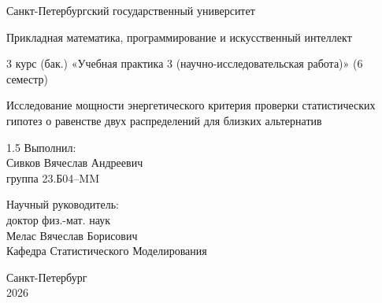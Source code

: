 \documentclass[12pt]{article}
\theoremstyle{break}
\begin{document}
\thispagestyle{empty}

\begin{center}
Санкт-Петербургский государственный университет\\

\vspace{0.1in}

Прикладная математика, программирование и искусственный интеллект\\

\vspace{1.2in}


3 курс (бак.) «Учебная практика 3 (научно-исследовательская работа)»  (6 семестр)\\

\vspace{0.2in}

\begin{large}
	

Исследование мощности энергетического критерия проверки статистических гипотез о равенстве двух распределений для близких альтернатив\\
\end{large}
\end{center}


\vspace{1.5in}

\begin{flushright}
	\begin{minipage}{0.5\textwidth} 
		\raggedright
		\begin{spacing}{1.5} 
Выполнил:\\
Сивков Вячеслав Андреевич\\
группа 23.Б04–MM\\

\vspace{0.3in}

Научный руководитель:\\
доктор физ.-мат. наук\\
Мелас Вячеслав Борисович\\
Кафедра Статистического Моделирования\\
	\end{spacing}
	\end{minipage}
\end{flushright}

\vspace{1.5in}

\begin{center}
Санкт-Петербург\\
\vspace{0.1in}
2026
\end{center}
\end{document}
